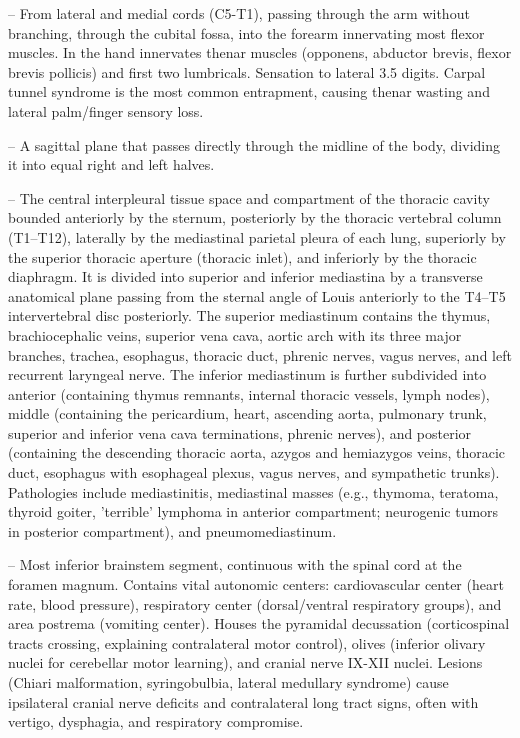 -- From lateral and medial cords (C5-T1), passing through the arm without branching, through the cubital fossa, into the forearm innervating most flexor muscles. In the hand innervates thenar muscles (opponens, abductor brevis, flexor brevis pollicis) and first two lumbricals. Sensation to lateral 3.5 digits. Carpal tunnel syndrome is the most common entrapment, causing thenar wasting and lateral palm/finger sensory loss.

-- A sagittal plane that passes directly through the midline of the body, dividing it into equal right and left halves.

-- The central interpleural tissue space and compartment of the thoracic cavity bounded anteriorly by the sternum, posteriorly by the thoracic vertebral column (T1--T12), laterally by the mediastinal parietal pleura of each lung, superiorly by the superior thoracic aperture (thoracic inlet), and inferiorly by the thoracic diaphragm. It is divided into superior and inferior mediastina by a transverse anatomical plane passing from the sternal angle of Louis anteriorly to the T4--T5 intervertebral disc posteriorly. The superior mediastinum contains the thymus, brachiocephalic veins, superior vena cava, aortic arch with its three major branches, trachea, esophagus, thoracic duct, phrenic nerves, vagus nerves, and left recurrent laryngeal nerve. The inferior mediastinum is further subdivided into anterior (containing thymus remnants, internal thoracic vessels, lymph nodes), middle (containing the pericardium, heart, ascending aorta, pulmonary trunk, superior and inferior vena cava terminations, phrenic nerves), and posterior (containing the descending thoracic aorta, azygos and hemiazygos veins, thoracic duct, esophagus with esophageal plexus, vagus nerves, and sympathetic trunks). Pathologies include mediastinitis, mediastinal masses (e.g., thymoma, teratoma, thyroid goiter, 'terrible' lymphoma in anterior compartment; neurogenic tumors in posterior compartment), and pneumomediastinum.

-- Most inferior brainstem segment, continuous with the spinal cord at the foramen magnum. Contains vital autonomic centers: cardiovascular center (heart rate, blood pressure), respiratory center (dorsal/ventral respiratory groups), and area postrema (vomiting center). Houses the pyramidal decussation (corticospinal tracts crossing, explaining contralateral motor control), olives (inferior olivary nuclei for cerebellar motor learning), and cranial nerve IX-XII nuclei. Lesions (Chiari malformation, syringobulbia, lateral medullary syndrome) cause ipsilateral cranial nerve deficits and contralateral long tract signs, often with vertigo, dysphagia, and respiratory compromise.

